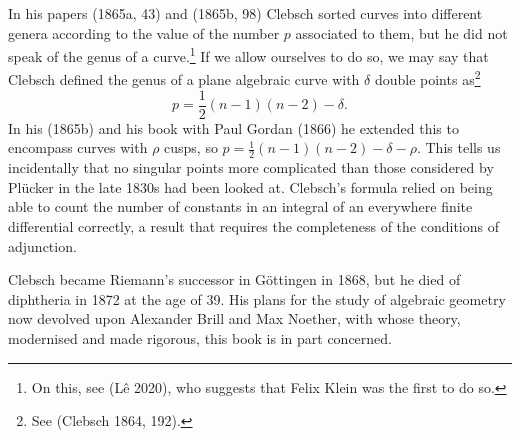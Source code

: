 \documentclass[11pt]{article}
\newcommand{\ha}{\frac{1}{2}}
\begin{document}
                                                                                                                                                                                                                                                                                                                                                                                                                                                                                                                                                                                                                                                                                                                                                                                                                                                                                                                                                                                                                                                                                                           
In his papers (1865a, 43) and (1865b, 98) Clebsch sorted curves into different genera according to the value of the number $p$ associated to them, but he did not speak of the genus of a curve.\footnote{On this, see (L\^e 2020), who suggests that Felix Klein was the first to do so.} If we allow ourselves to do so, we may say that Clebsch defined the genus of a plane algebraic curve with $\delta$ double points as\footnote{See (Clebsch 1864, 192).} 
 \[p = \ha (n-1)(n-2) - \delta.\]
In his (1865b) and his book with Paul Gordan (1866) he extended this to encompass curves with 
$\rho$ cusps, so $p= \ha (n-1)(n-2) - \delta - \rho.$ This tells us incidentally that no singular points more complicated than those considered by Pl\"ucker in the late 1830s had been looked at. Clebsch's formula relied on being able to count the number of constants in an integral of an everywhere finite differential correctly, a result that requires the  completeness of the conditions of adjunction.

Clebsch became   Riemann's successor in G\"ottingen in 1868, but  he died of diphtheria in 1872 at the age of 39. His plans for the study of algebraic geometry now devolved upon Alexander Brill and Max Noether, with whose theory, modernised and made rigorous,  this book is in part concerned.



\end{document}
